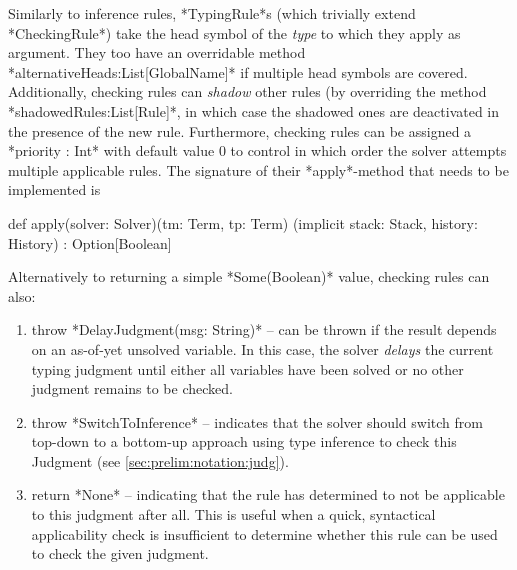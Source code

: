 Similarly to inference rules, *TypingRule*s (which trivially extend *CheckingRule*) take the head symbol of the \emph{type} to which they apply as argument. They too have an overridable method *alternativeHeads:List[GlobalName]* if multiple head symbols are covered. Additionally, checking rules can \emph{shadow} other rules (by overriding the method *shadowedRules:List[Rule]*, in which case the shadowed ones are deactivated in the presence of the new rule. Furthermore, checking rules can be assigned a *priority : Int* with default value 0 to control in which order the solver attempts multiple applicable rules. The signature of their *apply*-method that needs to be implemented is
\begin{scalacode}
def apply(solver: Solver)(tm: Term, tp: Term)
	(implicit stack: Stack, history: History) : Option[Boolean]
\end{scalacode}
Alternatively to returning a simple *Some(Boolean)* value, checking rules can also:
\begin{enumerate}
	\item throw *DelayJudgment(msg: String)* -- can be thrown if the result depends on an as-of-yet unsolved variable. In this case, the solver \emph{delays} the current typing judgment until either all variables have been solved or no other judgment remains to be checked.
	\item throw *SwitchToInference* -- indicates that the solver should switch from top-down to a bottom-up approach using type inference to check this Judgment (see \autoref{sec:prelim:notation:judg}).
	\item return *None* -- indicating that the rule has determined to not be applicable to this judgment after all. This is useful when a quick, syntactical applicability check is insufficient to determine whether this rule can be used to check the given judgment.
\end{enumerate}

